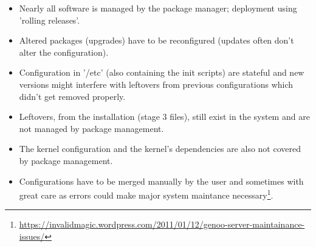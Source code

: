 \documentclass[a4paper,10pt]{article}
\begin{document}
\begin{itemize}
\item Nearly all software is managed by the package manager; deployment using 'rolling releases'.
\item Altered packages (upgrades) have to be reconfigured (updates often don't alter the configuration).
\item Configuration in '/etc' (also containing the init scripts) are stateful and new versions might interfere with leftovers from previous configurations which didn't get removed properly.
\item Leftovers, from the installation (stage 3 files), still exist in the system and are not managed by package management.
\item The kernel configuration and the kernel's dependencies are also not covered by package management.
\item Configurations have to be merged manually by the user and sometimes with great care as errors could make major system maintance necessary\footnote{\url{https://invalidmagic.wordpress.com/2011/01/12/genoo-server-maintainance-issues/}}.
\end{itemize}
\end{document}
